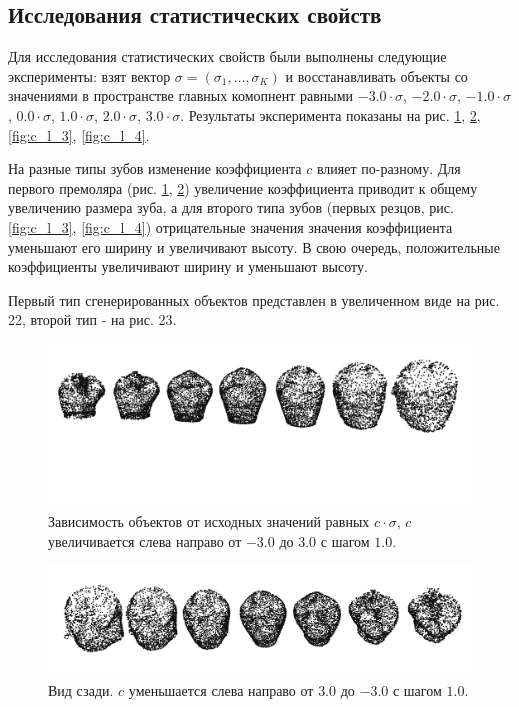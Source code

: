 \subsection{Исследования статистических свойств}
Для исследования статистических свойств были выполнены следующие эксперименты: взят вектор $\sigma = (\sigma_{1}, \ldots, \sigma_{K})$ и восстанавливать объекты со значениями в пространстве главных комопнент равными $-3.0 \cdot \sigma$, $-2.0 \cdot \sigma$, $-1.0 \cdot \sigma$, $0.0 \cdot \sigma$, $1.0 \cdot \sigma$, $2.0 \cdot \sigma$, $3.0 \cdot \sigma$. Результаты эксперимента показаны на рис. \ref{fig:c_l_1}, \ref{fig:c_l_2}, \ref{fig:c_l_3}, \ref{fig:c_l_4}.

На разные типы зубов изменение коэффициента $c$ влияет по-разному. Для первого премоляра (рис. \ref{fig:c_l_1}, \ref{fig:c_l_2}) увеличение коэффициента приводит к общему увеличению размера зуба, а для второго типа зубов (первых резцов, рис. \ref{fig:c_l_3}, \ref{fig:c_l_4}) отрицательные значения значения коэффициента уменьшают его ширину и увеличивают высоту. В свою очередь, положительные коэффициенты увеличивают ширину и уменьшают высоту.

Первый тип сгенерированных объектов представлен в увеличенном виде на рис. 22, второй тип - на рис. 23.

\begin{figure}[h]
\includegraphics[width=1\linewidth]{images/snapshot_gen_44_var00.png}
\caption{Зависимость объектов от исходных значений равных $c \cdot \sigma$, $c$ увеличивается слева направо от $-3.0$ до $3.0$ с шагом $1.0$.}
\label{fig:c_l_1}
\end{figure}

\begin{figure}[h]
\includegraphics[width=1\linewidth]{images/snapshot_gen_44_var01.png}
\caption{Вид сзади. $c$ уменьшается слева направо от $3.0$ до $-3.0$ с шагом $1.0$.}
\label{fig:c_l_2}
\end{figure}


